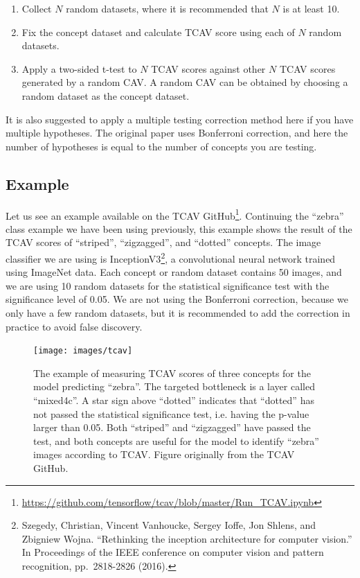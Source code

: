 \documentclass[
  10pt,
]{scrbook}
\providecommand{\tightlist}{%
  \setlength{\itemsep}{0pt}\setlength{\parskip}{0pt}}
\renewcommand{\href}[2]{#2\footnote{\url{#1}}}
\begin{document}
\begin{enumerate}
\def\labelenumi{\arabic{enumi}.}
\tightlist
\item
  Collect \(N\) random datasets, where it is recommended that \(N\) is at least 10.
\item
  Fix the concept dataset and calculate TCAV score using each of \(N\) random datasets.
\item
  Apply a two-sided t-test to \(N\) TCAV scores against other \(N\) TCAV scores generated by a random CAV.
  A random CAV can be obtained by choosing a random dataset as the concept dataset.
\end{enumerate}

It is also suggested to apply a multiple testing correction method here if you have multiple hypotheses.
The original paper uses Bonferroni correction, and here the number of hypotheses is equal to the number of concepts you are testing.

\hypertarget{example-9}{%
\subsection{Example}\label{example-9}}

Let us see an example available on the TCAV \href{https://github.com/tensorflow/tcav/blob/master/Run_TCAV.ipynb}{GitHub}.
Continuing the ``zebra'' class example we have been using previously, this example shows the result of the TCAV scores of ``striped'', ``zigzagged'', and ``dotted'' concepts.
The image classifier we are using is InceptionV3\footnote{Szegedy, Christian, Vincent Vanhoucke, Sergey Ioffe, Jon Shlens, and Zbigniew Wojna. ``Rethinking the inception architecture for computer vision.'' In Proceedings of the IEEE conference on computer vision and pattern recognition, pp.~2818-2826 (2016).}, a convolutional neural network trained using ImageNet data.
Each concept or random dataset contains 50 images, and we are using 10 random datasets for the statistical significance test with the significance level of 0.05.
We are not using the Bonferroni correction, because we only have a few random datasets, but it is recommended to add the correction in practice to avoid false discovery.

\begin{figure}

{\centering \texttt{[image: images/tcav]} 

}

\caption{The example of measuring TCAV scores of three concepts for the model predicting “zebra”. The targeted bottleneck is a layer called “mixed4c”. A star sign above “dotted” indicates that “dotted” has not passed the statistical significance test, i.e. having the p-value larger than 0.05. Both “striped” and “zigzagged” have passed the test, and both concepts are useful for the model to identify “zebra” images according to TCAV. Figure originally from the TCAV GitHub.}\label{fig:unnamed-chunk-61}
\end{figure}
\end{document}
